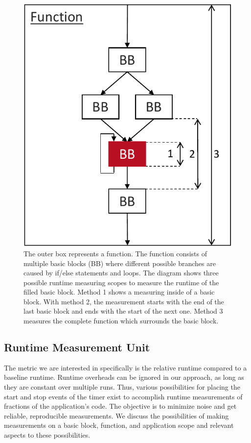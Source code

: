 \begin{figure}
    \centering
    \includegraphics[scale=0.8]{img/ppt/runtime_measurement_scopes-crop.pdf}
    \caption[Possibile scopes for measuring runtimes]{The outer box represents a function. 
    The function consists of multiple basic blocks (BB) where different possible branches are caused by if/else statements and loops. 
    The diagram shows three possible runtime measuring scopes to measure the runtime of the filled basic block.
    Method 1 shows a measuring inside of a basic block. 
    With method 2, the measurement starts with the end of the last basic block and ends with the start of the next one.
    Method 3 measures the complete function which surrounds the basic block.}
    \label{fig:approach:runtime_scopes}
\end{figure}

\subsection{Runtime Measurement Unit}
\tobechecked
The metric we are interested in specifically is the relative runtime compared to a baseline runtime.
Runtime overheads can be ignored in our approach, as long as they are constant over multiple runs.
Thus, various possibilities for placing the start and stop events of the timer exist to accomplish runtime measurements of fractions of the application's code.
The objective is to minimize noise and get reliable, reproducible measurements.
We discuss the possibilities of making measurements on a basic block, function, and application scope and relevant aspects to these possibilities.

